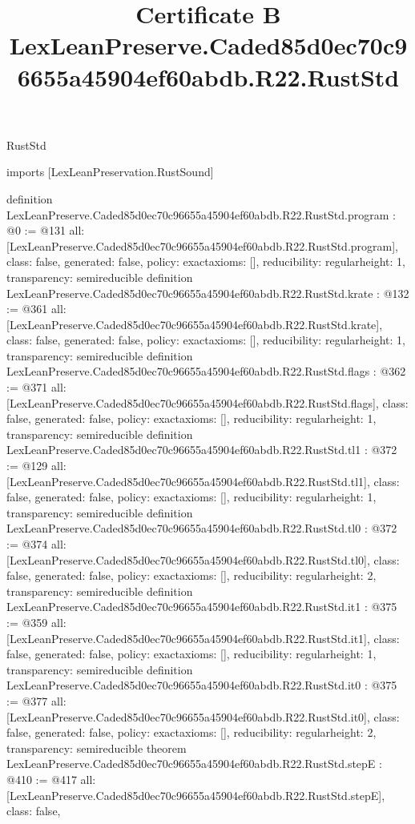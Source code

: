 \begin{lexlean}{RustStd}
\title{Certificate B LexLeanPreserve.Caded85d0ec70c96655a45904ef60abdb.R22.RustStd}
\begin{coremodule}
imports [LexLeanPreservation.RustSound]

definition LexLeanPreserve.Caded85d0ec70c96655a45904ef60abdb.R22.RustStd.program : @0 := @131 {
  all: [LexLeanPreserve.Caded85d0ec70c96655a45904ef60abdb.R22.RustStd.program],
  class: false,
  generated: false,
  policy: exact{axioms: []},
  reducibility: regular{height: 1},
  transparency: semireducible
}
definition LexLeanPreserve.Caded85d0ec70c96655a45904ef60abdb.R22.RustStd.krate : @132 := @361 {
  all: [LexLeanPreserve.Caded85d0ec70c96655a45904ef60abdb.R22.RustStd.krate],
  class: false,
  generated: false,
  policy: exact{axioms: []},
  reducibility: regular{height: 1},
  transparency: semireducible
}
definition LexLeanPreserve.Caded85d0ec70c96655a45904ef60abdb.R22.RustStd.flags : @362 := @371 {
  all: [LexLeanPreserve.Caded85d0ec70c96655a45904ef60abdb.R22.RustStd.flags],
  class: false,
  generated: false,
  policy: exact{axioms: []},
  reducibility: regular{height: 1},
  transparency: semireducible
}
definition LexLeanPreserve.Caded85d0ec70c96655a45904ef60abdb.R22.RustStd.tl1 : @372 := @129 {
  all: [LexLeanPreserve.Caded85d0ec70c96655a45904ef60abdb.R22.RustStd.tl1],
  class: false,
  generated: false,
  policy: exact{axioms: []},
  reducibility: regular{height: 1},
  transparency: semireducible
}
definition LexLeanPreserve.Caded85d0ec70c96655a45904ef60abdb.R22.RustStd.tl0 : @372 := @374 {
  all: [LexLeanPreserve.Caded85d0ec70c96655a45904ef60abdb.R22.RustStd.tl0],
  class: false,
  generated: false,
  policy: exact{axioms: []},
  reducibility: regular{height: 2},
  transparency: semireducible
}
definition LexLeanPreserve.Caded85d0ec70c96655a45904ef60abdb.R22.RustStd.it1 : @375 := @359 {
  all: [LexLeanPreserve.Caded85d0ec70c96655a45904ef60abdb.R22.RustStd.it1],
  class: false,
  generated: false,
  policy: exact{axioms: []},
  reducibility: regular{height: 1},
  transparency: semireducible
}
definition LexLeanPreserve.Caded85d0ec70c96655a45904ef60abdb.R22.RustStd.it0 : @375 := @377 {
  all: [LexLeanPreserve.Caded85d0ec70c96655a45904ef60abdb.R22.RustStd.it0],
  class: false,
  generated: false,
  policy: exact{axioms: []},
  reducibility: regular{height: 2},
  transparency: semireducible
}
theorem LexLeanPreserve.Caded85d0ec70c96655a45904ef60abdb.R22.RustStd.stepE : @410 := @417 {
  all: [LexLeanPreserve.Caded85d0ec70c96655a45904ef60abdb.R22.RustStd.stepE],
  class: false,
}
\end{coremodule}
\end{lexlean}
